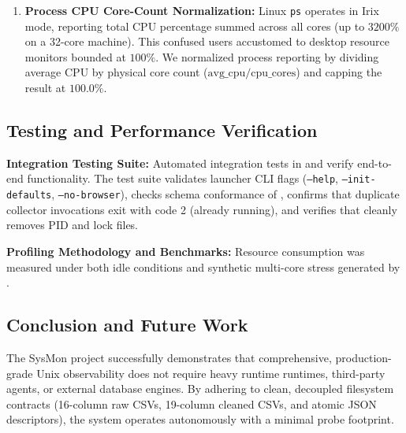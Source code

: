 \begin{enumerate}
    \item \textbf{Process CPU Core-Count Normalization:}
    Linux \texttt{ps} operates in Irix mode, reporting total CPU percentage summed across all cores (up to $3200\%$ on a 32-core machine). This confused users accustomed to desktop resource monitors bounded at $100\%$. We normalized process reporting by dividing average CPU by physical core count ($\text{avg\_cpu} / \text{cpu\_cores}$) and capping the result at $100.0\%$.

\end{enumerate}

\subsection{Testing and Performance Verification}
\textbf{Integration Testing Suite:} Automated integration tests in  and  verify end-to-end functionality. The test suite validates launcher CLI flags (\texttt{--help}, \texttt{--init-defaults}, \texttt{--no-browser}), checks schema conformance of , confirms that duplicate collector invocations exit with code 2 (already running), and verifies that  cleanly removes PID and lock files.

\textbf{Profiling Methodology and Benchmarks:} Resource consumption was measured under both idle conditions and synthetic multi-core stress generated by .

\subsection{Conclusion and Future Work}
The SysMon project successfully demonstrates that comprehensive, production-grade Unix observability does not require heavy runtime runtimes, third-party agents, or external database engines. By adhering to clean, decoupled filesystem contracts (16-column raw CSVs, 19-column cleaned CSVs, and atomic JSON descriptors), the system operates autonomously with a minimal probe footprint.

